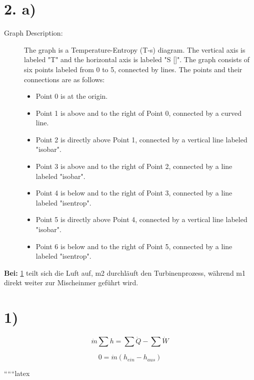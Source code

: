 \section*{2. a)}

\begin{description}
    \item[Graph Description:] The graph is a Temperature-Entropy (T-s) diagram. The vertical axis is labeled "T" and the horizontal axis is labeled "S []". The graph consists of six points labeled from 0 to 5, connected by lines. The points and their connections are as follows:
    \begin{itemize}
        \item Point 0 is at the origin.
        \item Point 1 is above and to the right of Point 0, connected by a curved line.
        \item Point 2 is directly above Point 1, connected by a vertical line labeled "isobar".
        \item Point 3 is above and to the right of Point 2, connected by a line labeled "isobar".
        \item Point 4 is below and to the right of Point 3, connected by a line labeled "isentrop".
        \item Point 5 is directly above Point 4, connected by a vertical line labeled "isobar".
        \item Point 6 is below and to the right of Point 5, connected by a line labeled "isentrop".
    \end{itemize}
\end{description}

\noindent
\textbf{Bei:} \underline{1} teilt sich die Luft auf, m2 durchläuft den Turbinenprozess, während m1 direkt weiter zur Mischeinmer geführt wird.

\section*{1)}

\[
\dot{m} \sum h = \sum \dot{Q} - \sum \dot{W}
\]

\[
0 = \dot{m} (h_{ein} - h_{aus})
\]

``````latex